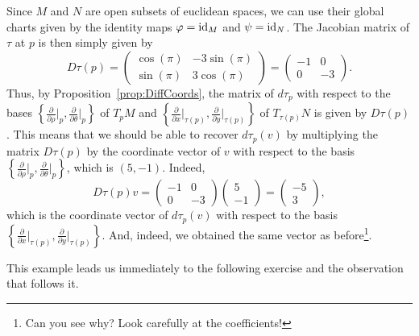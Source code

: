 \begin{example}
	Since $M$ and $N$ are open subsets of euclidean spaces, we can use their global charts given by the identity maps $\varphi = \operatorname{id}_M$ and $\psi = \operatorname{id}_N$.
	The Jacobian matrix of $\tau$ at $p$ is then simply given by
	\begin{equation}
		D\tau(p) =
		\begin{pmatrix}
			\cos(\pi) & -3\sin(\pi) \\
			\sin(\pi) & 3\cos(\pi)
		\end{pmatrix} =
		\begin{pmatrix}
			-1 & 0  \\
			0  & -3
		\end{pmatrix}.
	\end{equation}
	Thus, by Proposition~\ref{prop:DiffCoords}, the matrix of $d\tau_p$ with respect to the bases $\left\{\frac{\partial}{\partial \rho}\big|_p, \frac{\partial}{\partial \theta}\big|_p\right\}$ of $T_pM$ and $\left\{\frac{\partial}{\partial x}\big|_{\tau(p)}, \frac{\partial}{\partial y}\big|_{\tau(p)}\right\}$ of $T_{\tau(p)}N$ is given by $D\tau(p)$.
	This means that we should be able to recover $d\tau_p(v)$ by multiplying the matrix $D\tau(p)$ by the coordinate vector of $v$ with respect to the basis $\left\{\frac{\partial}{\partial \rho}\big|_p, \frac{\partial}{\partial \theta}\big|_p\right\}$, which is $(5, -1)$.
	Indeed,
	\begin{equation}
		D\tau(p) v =
		\begin{pmatrix}
			-1 & 0  \\
			0  & -3
		\end{pmatrix}
		\begin{pmatrix}
			5 \\ -1
		\end{pmatrix} =
		\begin{pmatrix}
			-5 \\ 3
		\end{pmatrix},
	\end{equation}
	which is the coordinate vector of $d\tau_p(v)$ with respect to the basis $\left\{\frac{\partial}{\partial x}\big|_{\tau(p)}, \frac{\partial}{\partial y}\big|_{\tau(p)}\right\}$.
	And, indeed, we obtained the same vector as before\footnote{Can you see why? Look carefully at the coefficients!}.
\end{example}

This example leads us immediately to the following exercise and the observation that follows it.

